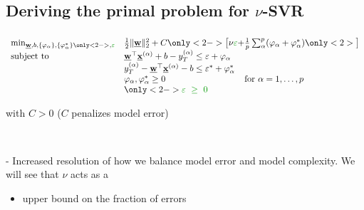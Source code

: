 \subsection{Deriving the primal problem for $\nu$-SVR}

\begin{frame}\frametitle{\subsecname}

\slidesonly{\vspace{-4mm}}

\begin{block}{}
     \begin{equation}
        \begin{array}{ll}
        \min_{\vec w, b,\{\varphi_\alpha\}, \{\varphi_\alpha^*\}\only<2->{, {\color{darkgreen}{\varepsilon}}}} & \frac{1}{2} \lVert \vec w \rVert_{2}^{2} + C \only<2->{\big\lbrack \nu{\color{darkgreen}\varepsilon} + } \frac{1}{p} \sum_{\alpha}^p (\varphi_\alpha + \varphi_\alpha^*) \only<2>{\big\rbrack}\\
        \text{subject to} & 
        \vec w^{\top} \vec x^{(\alpha)} + b - y_{T}^{(\alpha)} \le \varepsilon + \varphi_\alpha\\
        &
        y_{T}^{(\alpha)} - \vec w^{\top} \vec x^{(\alpha)} - b \le \varepsilon^* + \varphi_\alpha^*\\
        &\varphi_\alpha, \varphi_\alpha^* \ge 0  \qquad\qquad\qquad\qquad\quad \text{for }\alpha=1,\ldots,p \\
        &\only<2->{{\color{darkgreen}\varepsilon~\ge~0}}
        \end{array}
        \label{eq:primalnu}
     \end{equation}
     
     \slidesonly{\vspace{-3mm}}
        with $C>0$ ($C$ penalizes model error)
\end{block}

\pause


     \slidesonly{\vspace{-3mm}}

     \\
     
\pause

     - Increased resolution of how we balance model error and model complexity. We will see that $\nu$ acts as a
     \begin{itemize}
     \item upper bound on the fraction of errors
     

\end{itemize}
\end{frame}
